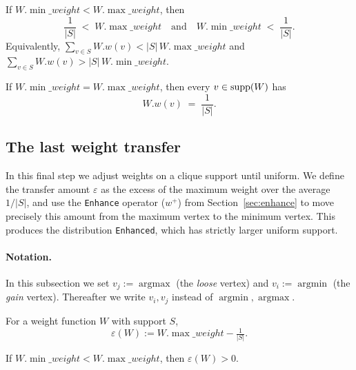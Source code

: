 \begin{lemma}\label{lem:strict-avg-vs-extrema}
If \(W.\min\_weight < W.\max\_weight\), then
\[
  \frac{1}{|S|} \;<\; W.\max\_weight
  \quad\text{and}\quad
  W.\min\_weight \;<\; \frac{1}{|S|}.
\]
Equivalently,
\(\sum_{v\in S}W.w(v) < |S|\,W.\max\_weight\) and
\(\sum_{v\in S}W.w(v) > |S|\,W.\min\_weight\).
\leanok
\end{lemma}

\begin{lemma}[Flat support iff min=max]\label{lem:min-eq-max-uniform}
If \(W.\min\_weight = W.\max\_weight\), then every \(v\in\operatorname{supp}(W)\) has
\[
  W.w(v) \;=\; \frac{1}{|S|}.
\]
\leanok
\end{lemma}

\subsection{The last weight transfer}\label{sec:last-transfer}

In this final step we adjust weights on a clique support until uniform.
We define the transfer amount \(\varepsilon\) as the excess of the maximum weight
over the average \(1/|S|\), and use the \texttt{Enhance} operator (\(w^+\)) from
Section~\ref{sec:enhance} to move precisely this amount from the
maximum vertex to the minimum vertex.
This produces the distribution \texttt{Enhanced}, which has strictly
larger uniform support.

\paragraph{Notation.}
In this subsection we set \(v_j :=\operatorname{argmax}\) (the \emph{loose} vertex) and \(v_i := \operatorname{argmin}\) (the \emph{gain} vertex).
Thereafter we write \(v_i,v_j\) instead of \(\operatorname{argmin},\operatorname{argmax}\).

\begin{definition}\label{def:the-eps}
For a weight function \(W\) with support \(S\),
\[
  \varepsilon(W) := W.\max\_weight - \tfrac{1}{|S|}.
\]
\leanok
\end{definition}

\begin{lemma}\label{lem:eps-pos}
If \(W.\min\_weight < W.\max\_weight\), then
\(\varepsilon(W) > 0\).
\leanok
\end{lemma}

